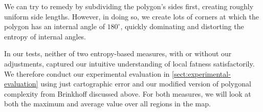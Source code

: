 We can try to remedy by subdividing the polygon's sides first, creating roughly uniform side lengths.
However, in doing so, we create lots of corners at which the polygon has an internal angle of $180^\circ$, quickly dominating and distorting the entropy of internal angles.

In our tests, neither of two entropy-based measures, with or without our adjustments, captured our intuitive understanding of local fatness satisfactorily.
We therefore conduct our experimental evaluation in \cref{sect:experimental-evaluation} using just cartographic error and our modified version of polygonal complexity from Brinkhoff \etal{} \cite{brinkhoff1995measuring} discussed above.
For both measures, we will look at both the maximum and average value over all regions in the map.
